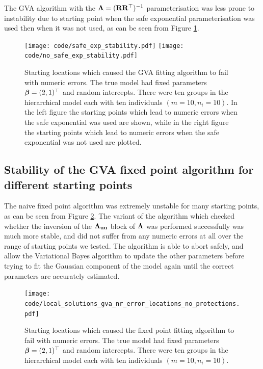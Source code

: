 The GVA algorithm with the ${\boldsymbol \Lambda} = ({\bf R} {\bf R}^\top)^{-1}$ parameterisation
was less prone to instability due to starting point when the safe exponential
parameterisation was used then when it was not used, as can be seen from Figure
\ref{fig:stability_locations_gva}. %
\begin{figure}[h]
	\texttt{[image: code/safe\_exp\_stability.pdf]}
	\texttt{[image: code/no\_safe\_exp\_stability.pdf]}
	\label{fig:stability_locations_gva}\bigskip
	\caption{
        Starting locations which caused the GVA fitting algorithm to fail with
        numeric errors. The true model had fixed parameters ${\boldsymbol \beta} = (2,
        1)^\top$ and random intercepts. There were ten groups in the
        hierarchical model each	with ten individuals $(m=10, n_i=10)$. In the
        left figure the starting points which lead to numeric errors when the
        safe exponential was used are shown, while in the right figure the
        starting points which lead to numeric errors when the safe exponential
        was not used are plotted.
    }
\end{figure}

\subsection{Stability of the GVA fixed point algorithm for different starting
points}
The naive fixed point algorithm was extremely unstable for many starting
points, as can be seen from Figure \ref{fig:stability_locations_nr}.  The
variant of the algorithm which checked whether the inversion of the
${\boldsymbol \Lambda}_{{\bf u} {\bf u}}$ block of ${\boldsymbol \Lambda}$ was performed successfully was much
more stable, and did not suffer from any numeric errors at all over the range
of starting points we tested.  The algorithm is able to abort safely, and allow
the Variational Bayes algorithm to update the other parameters before trying to
fit the Gaussian component of the model again until the correct parameters are
accurately estimated.

\begin{figure}[h!]
	\texttt{[image: code/local\_solutions\_gva\_nr\_error\_locations\_no\_protections.pdf]}
	\label{fig:stability_locations_nr} \bigskip 
    \caption{Starting locations which caused the fixed point fitting algorithm to fail with numeric errors. The true model had fixed parameters ${\boldsymbol \beta} = (2, 1)^\top$ and random intercepts. There were ten groups in the
	hierarchical model each	with ten individuals $(m=10, n_i=10)$.}
\end{figure}

